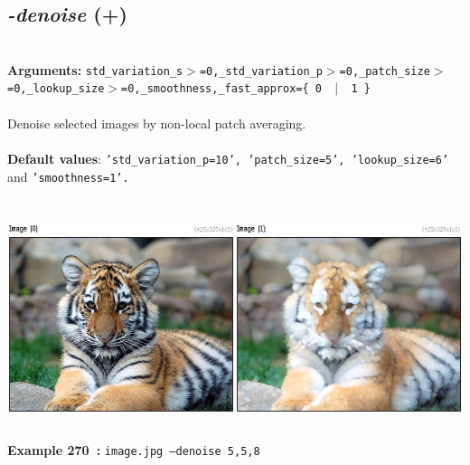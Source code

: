 \documentclass[a4paper,11pt,twoside]{book}
\begin{document}
\subsection{\emph{-denoise} (+)}\vspace*{-0.5em}
~\\\textbf{Arguments: } 
{\small \texttt{std\_variation\_s$>$=0,\_std\_variation\_p$>$=0,\_patch\_size$>$=0,\_lookup\_size$>$=0,\_smoothness,\_fast\_approx=\{ 0 ~$|$~ 1 \}}}\\~\\
Denoise selected images by non-local patch averaging.
~\\~\\\textbf{Default values}: {\small \texttt{'std\_variation\_p=10', 'patch\_size=5', 'lookup\_size=6'} and \texttt{'smoothness=1'.}}
\begin{center}\includegraphics[keepaspectratio=true,height=7cm,width=\textwidth]{img/gmic_def270.jpg}\\
{\footnotesize \textbf{Example 270~:} \texttt{image.jpg --denoise 5,5,8}}
\end{center}
\end{document}

